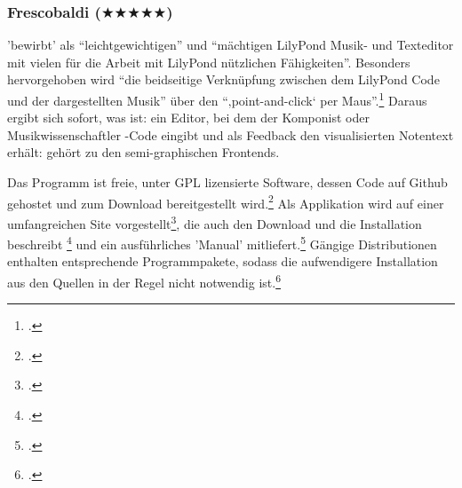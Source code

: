 %
%
%



\subsubsection{Frescobaldi ($\bigstar\bigstar\bigstar\bigstar\bigstar$)}

\label{Frescobaldi} 'bewirbt'  als
\enquote{leichtgewichtigen} und \enquote{mächtigen LilyPond Musik- und
Texteditor mit vielen für die Arbeit mit LilyPond nützlichen Fähigkeiten}.
Besonders hervorgehoben wird \enquote{die beidseitige Verknüpfung zwischen dem
LilyPond Code und der dargestellten Musik} über den \enquote{‚point-and-click‘
per Maus}.\footcite[vgl.][\nopage wp]{LilyPond2018g} Daraus ergibt sich sofort,
was  ist: ein Editor, bei dem der Komponist oder
Musikwissenschaftler -Code eingibt und als Feedback den
visualisierten Notentext erhält:  gehört zu den
semi-graphischen Frontends.

Das Programm ist freie, unter GPL lizensierte Software, dessen Code auf Github
ge\-hos\-tet und zum Download bereitgestellt wird.\footcite[vgl.][\nopage
wp]{Frescobaldi2019a} Als Applikation wird  auf einer
umfangreichen Site vorgestellt\footcite[vgl.][\nopage wp]{Frescobaldi2017a}, die
auch den Download und die Installation beschreibt \footcite[vgl.][\nopage
wp]{Frescobaldi2015a} und ein ausführliches 'Manual'
mitliefert.\footcite[vgl.][\nopage wp]{Frescobaldi2012a} Gängige Distributionen
enthalten entsprechende Programmpakete, sodass die aufwendigere Installation aus
den Quellen in der Regel nicht notwendig ist.\footcite[vgl.][\nopage
wp]{UbuntuFrescobaldi2016a}

